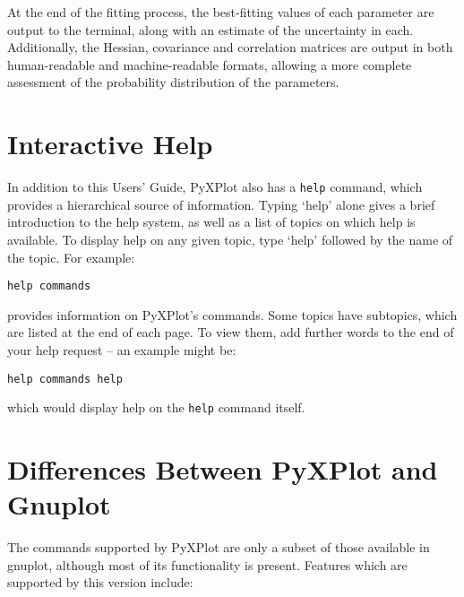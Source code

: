 At the end of the fitting process, the best-fitting values of each parameter
are output to the terminal, along with an estimate of the uncertainty in each.
Additionally, the Hessian, covariance and correlation matrices are output in
both human-readable and machine-readable formats, allowing a more complete
assessment of the probability distribution of the parameters.

\section{Interactive Help}

In addition to this Users' Guide, PyXPlot also has a \texttt{help} command,
which provides a hierarchical source of information. Typing `help' alone gives a
brief introduction to the help system, as well as a list of topics on which
help is available. To display help on any given topic, type `help' followed by
the name of the topic. For example:

\begin{verbatim}
help commands
\end{verbatim}

\noindent provides information on PyXPlot's commands. Some topics have
subtopics, which are listed at the end of each page. To view them, add further
words to the end of your help request -- an example might be:

\begin{verbatim}
help commands help
\end{verbatim}

\noindent which would display help on the \texttt{help} command itself.

\section{Differences Between PyXPlot and Gnuplot}
\label{missing_features}

The commands supported by PyXPlot are only a subset of those available in
gnuplot, although most of its functionality is present. Features which are
supported by this version include:

